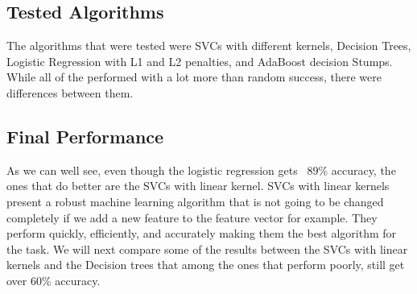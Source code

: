 \documentclass{article}
\begin{document}
\subsection{Tested Algorithms}
The algorithms that were tested were SVCs with different kernels, Decision Trees, Logistic Regression with L1 and L2 penalties, and AdaBoost decision Stumps. While all of the performed with a lot more than random success, there were differences between them.

\subsection{Final Performance}

 As we can well see, even though the logistic regression gets ~89\% accuracy, the ones that do better are the SVCs with linear kernel. SVCs with linear kernels present a robust machine learning algorithm that is not going to be changed completely if we add a new feature to the feature vector for example. They perform quickly, efficiently, and accurately making them the best algorithm for the task. We will next compare some of the results between the SVCs with linear kernels and the Decision trees that among the ones that perform poorly, still get over 60\% accuracy.
\end{document}
